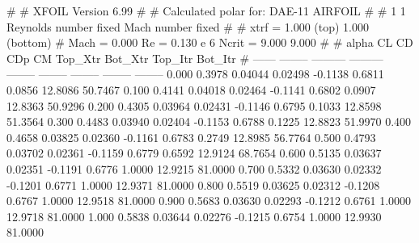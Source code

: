 #  
#       XFOIL         Version 6.99
#  
# Calculated polar for: DAE-11 AIRFOIL                                  
#  
# 1 1 Reynolds number fixed          Mach number fixed         
#  
# xtrf =   1.000 (top)        1.000 (bottom)  
# Mach =   0.000     Re =     0.130 e 6     Ncrit =   9.000  9.000
#  
#   alpha    CL        CD       CDp       CM     Top_Xtr  Bot_Xtr  Top_Itr  Bot_Itr
#  ------ -------- --------- --------- -------- -------- -------- -------- --------
   0.000   0.3978   0.04044   0.02498  -0.1138   0.6811   0.0856  12.8086  50.7467
   0.100   0.4141   0.04018   0.02464  -0.1141   0.6802   0.0907  12.8363  50.9296
   0.200   0.4305   0.03964   0.02431  -0.1146   0.6795   0.1033  12.8598  51.3564
   0.300   0.4483   0.03940   0.02404  -0.1153   0.6788   0.1225  12.8823  51.9970
   0.400   0.4658   0.03825   0.02360  -0.1161   0.6783   0.2749  12.8985  56.7764
   0.500   0.4793   0.03702   0.02361  -0.1159   0.6779   0.6592  12.9124  68.7654
   0.600   0.5135   0.03637   0.02351  -0.1191   0.6776   1.0000  12.9215  81.0000
   0.700   0.5332   0.03630   0.02332  -0.1201   0.6771   1.0000  12.9371  81.0000
   0.800   0.5519   0.03625   0.02312  -0.1208   0.6767   1.0000  12.9518  81.0000
   0.900   0.5683   0.03630   0.02293  -0.1212   0.6761   1.0000  12.9718  81.0000
   1.000   0.5838   0.03644   0.02276  -0.1215   0.6754   1.0000  12.9930  81.0000
